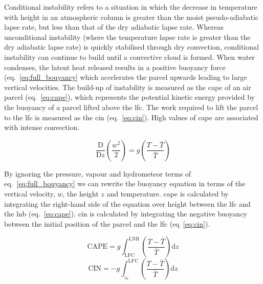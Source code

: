 Conditional instability refers to a situation in which the decrease in temperature with height in an atmospheric column is greater than the moist pseudo-adiabatic lapse rate, but less than that of the dry adiabatic lapse rate. 
Whereas unconditional instability (where the temperature lapse rate is greater than the dry adiabatic lapse rate) is quickly stabilised through dry convection, conditional instability can continue to build until a convective cloud is formed. 
When water condenses, the latent heat released results in a positive buoyancy force (eq.~\ref{eq:full_bouyancy} which accelerates the parcel upwards leading to large vertical velocities.
The build-up of instability is measured as the \acrfull{cape} of an air parcel (eq.~\ref{eq:cape}), which represents the potential kinetic energy provided by the buoyancy of a parcel lifted above the \acrshort{lfc}. The work required to lift the parcel to the \acrshort{lfc} is measured as the \acrfull{cin} (eq.~\ref{eq:cin}). High values of \acrshort{cape} are associated with intense convection.

\begin{eqfloat}
    \begin{equation}
    \label{eq:simple_bouyancy}
        \frac{\mathrm{D} }{\mathrm{D} z} \left (\frac{w^2}{2}  \right ) = g \left ( \frac{T - \bar{T}}{\bar{T}} \right )
    \end{equation}
    \caption{By ignoring the pressure, vapour and hydrometeor terms of eq.~\ref{eq:full_bouyancy} we can rewrite the buoyancy equation in terms of the vertical velocity, $w$, the height $z$ and temperature. \acrshort{cape} is calculated by integrating the right-hand side of the equation over height between the \acrshort{lfc} and the \acrfull{lnb} (eq.~\ref{eq:cape}). \acrshort{cin} is calculated by integrating the negative buoyancy between the initial position of the parcel and the \acrshort{lfc} (eq~\ref{eq:cin}).}
    \begin{equation}
    \label{eq:cape}
        \mathrm{CAPE} = g \int_{\mathrm{LFC}}^{\mathrm{LNB}} \left ( \frac{T - \bar{T}}{\bar{T}} \right ) \mathrm{d}z
    \end{equation}
    \begin{equation}
    \label{eq:cin}
        \mathrm{CIN} = - g \int_{z_0}^{\mathrm{LFC}} \left ( \frac{T - \bar{T}}{\bar{T}} \right ) \mathrm{d}z
    \end{equation}
\end{eqfloat}

